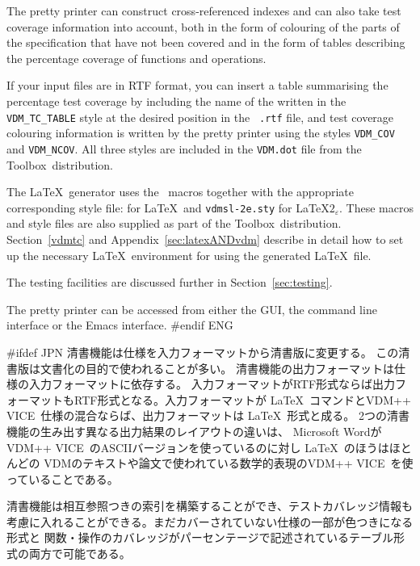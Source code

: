 \documentclass[\pformat,12pt]{article}
\newcommand{\vdmslpp}{VDM-SL}
\newcommand{\Toolbox}{Toolbox}
\newcommand{\VdmSlPp}{\VdmSl}
\newcommand{\vdmslpp}{VDM++}
\newcommand{\Toolbox}{Toolbox}
\DeclareRobustCommand{\VdmSlPp}{VDM++-\VdmSl}
\renewcommand{\vdmslpp}{VDM++ VICE}
\DeclareRobustCommand{\VdmSlPp}{VDM++ VICE-\VdmSl}
\begin{document}
The pretty printer can construct cross-referenced indexes and can also
take test coverage information into account, both in the form of
colouring of the parts of the specification that have not been covered
and in the form of tables describing the percentage coverage of
functions and operations.

If your input files are in  RTF format, you can insert a table
summarising the percentage test coverage by including the name of the
 written in the
\texttt{VDM\_TC\_TABLE} style at the desired position in the {\tt
  .rtf} file, and test coverage colouring information is written by the
pretty printer using the styles \texttt{VDM\_COV} and
\texttt{VDM\_NCOV}. All three styles are included in the {\tt VDM.dot} 
file from the \Toolbox\ distribution.

The \LaTeX\ generator uses the \VdmSlPp\ macros together with the
appropriate corresponding style file:
 for \LaTeX\ and 
{\tt vdmsl-2e.sty} for \LaTeX$2_{\varepsilon}$. These macros and style
files are also supplied as part of the \Toolbox\
distribution. Section~\ref{vdmtc} and Appendix~\ref{sec:latexANDvdm}
describe in detail how to set up the necessary \LaTeX\ environment for
using the generated \LaTeX\ file.

The testing facilities are discussed further in
Section~\ref{sec:testing}.

The pretty printer can be accessed from either the GUI, the
command line interface or the Emacs interface.
#endif ENG

#ifdef JPN
清書機能は仕様を入力フォーマットから清書版に変更する。
この清書版は文書化の目的で使われることが多い。
清書機能の出力フォーマットは仕様の入力フォーマットに依存する。
入力フォーマットがRTF形式ならば出力フォーマットもRTF形式となる。入力フォーマットが
 \LaTeX\ コマンドと\vdmslpp\ 仕様の混合ならば、出力フォーマットは \LaTeX\ 形式と成る。
2つの清書機能の生み出す異なる出力結果のレイアウトの違いは、
Microsoft Wordが\vdmslpp\ のASCIIバージョンを使っているのに対し \LaTeX\ のほうはほとんどの
VDMのテキストや論文で使われている数学的表現の\vdmslpp\ を使っていることである。

清書機能は相互参照つきの索引を構築することができ、テストカバレッジ情報も
考慮に入れることができる。まだカバーされていない仕様の一部が色つきになる形式と
関数・操作のカバレッジがパーセンテージで記述されているテーブル形式の両方で可能である。
\end{document}
